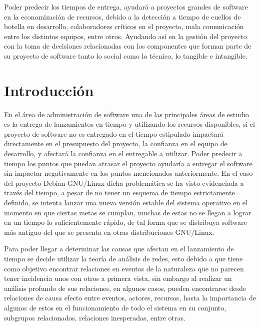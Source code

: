 \documentclass[12pt]{report}
\begin{document}
Poder predecir los tiempos de  entrega, ayudará a proyectos grandes de
software  en la  economización de  recursos, debido  a la  detección a
tiempo de cuellos de botella  en desarrollo, colaboradores críticos en
el  proyecto, mala  comunicación  entre los  distintos equipos,  entre
otros.  Ayudando  así en  la  gestión  del  proyecto  con la  toma  de
decisiones relacionadas  con los  componentes que  forman parte  de su
proyecto de  software tanto lo social  como lo técnico, lo  tangible e
intangible.

\chapter*{Introducción} En  el área de administración  de software una
de las principales  áreas de estudio es la entrega  de lanzamientos en
tiempo  y  utilizando los  recursos  disponibles,  si el  proyecto  de
software   no  es   entregado  en   el  tiempo   estipulado  impactará
directamente en el presupuesto del proyecto, la confianza en el equipo
de  desarrollo,   y  afectará   la  confianza   en  el   entregable  a
utilizar. Poder  predecir a  tiempo los puntos  que puedan  atrasar el
proyecto ayudaría a entregar el software sin impactar negativamente en
los puntos mencionados  anteriormente. En el caso  del proyecto Debian
GNU/Linux  dicha problemática  se ha  visto evidenciada  a través  del
tiempo,  a  pesar de  no  tener  un  esquema de  tiempo  estrictamente
definido,  se intenta  lanzar una  nueva versión  estable del  sistema
operativo en  el momento en  que ciertas  metas se cumplan,  muchas de
estas no se llegan a lograr en un tiempo lo suficientemente rápido, de
tal forma que  se distribuya software más antiguo del  que se presenta
en otras distribuciones GNU/Linux.

Para  poder  llegar  a  determinar   las  causas  que  afectan  en  el
lanzamiento  de tiempo  se decide  utilizar la  teoría de  análisis de
redes, esto debido  a que tiene como objetivo  encontrar relaciones en
eventos  de la  naturaleza que  no parecen  tener incidencia  unos con
otros a primera vista, sin embargo al realizar un análisis profundo de
sus relaciones, en algunos  casos, pueden encontrarse desde relaciones
de causa efecto entre eventos, actores, recursos, hasta la importancia
de algunos  de estos  en el  funcionamiento de todo  el sistema  en su
conjunto, subgrupos relacionados, relaciones inesperadas, entre otras.
\end{document}
